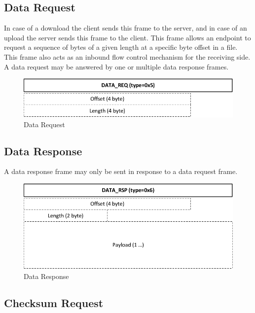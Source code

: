 \documentclass[]{article}
\begin{document}
\subsection{Data Request}

In case of a download the client sends this frame to the
server, and in case of an upload the server sends this
frame to the client. This frame allows an endpoint to 
request a sequence of bytes of a given length at a specific
byte offset in a file. This frame also acts as an inbound
flow control mechanism for the receiving side. A data 
request may be answered by one or multiple data response
frames.

\begin{figure}[H]
\centering
\includegraphics[width=\textwidth]{frames/data-req.pdf}
\caption{Data Request}
\label{DATA-REQ}
\end{figure}

\subsection{Data Response}

A data response frame may only be sent in response to a data
request frame.  

\begin{figure}[H]
\centering
\includegraphics[width=\textwidth]{frames/data-rsp.pdf}
\caption{Data Response}
\label{DATA-RSP}
\end{figure}

\subsection{Checksum Request}
\end{document}
